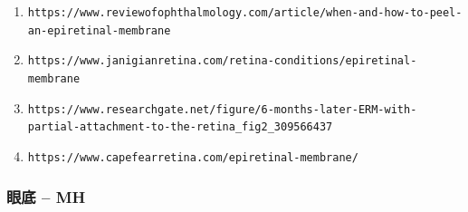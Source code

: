 \documentclass{article}
\begin{document}
\begin{enumerate}
		\item \nolinkurl{https://www.reviewofophthalmology.com/article/when-and-how-to-peel-an-epiretinal-membrane}
		
		\item \nolinkurl{https://www.janigianretina.com/retina-conditions/epiretinal-membrane}
		
		\item \nolinkurl{https://www.researchgate.net/figure/6-months-later-ERM-with-partial-attachment-to-the-retina_fig2_309566437}
		
		\item \nolinkurl{https://www.capefearretina.com/epiretinal-membrane/}
	\end{enumerate}
	
	\subsubsection*{眼底 -- MH}
	\vspace{0.5cm}
	
\end{document}
